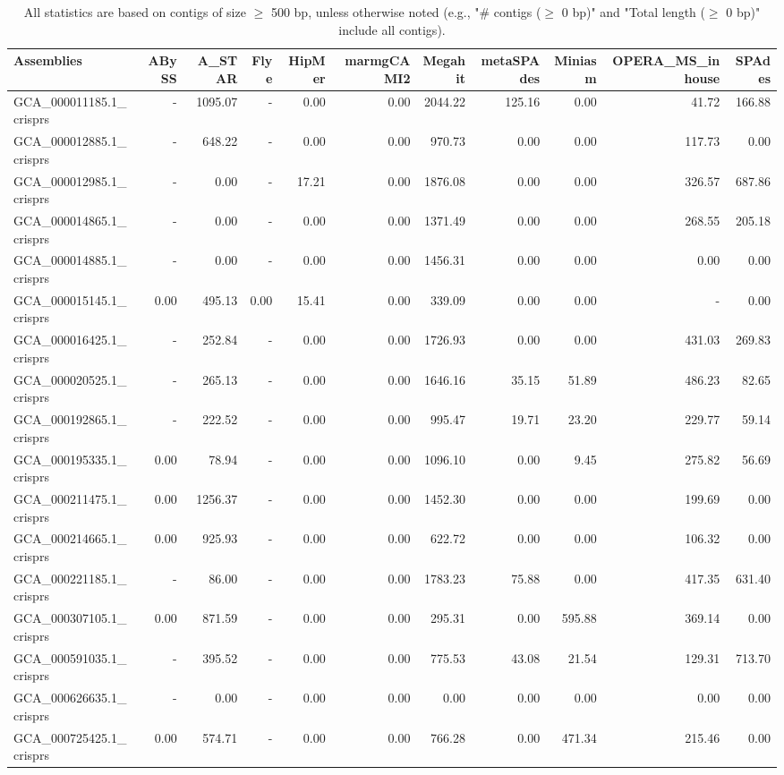 \documentclass[12pt,a4paper]{article}
\begin{document}
\begin{table}[ht]
\begin{center}
\caption{All statistics are based on contigs of size $\geq$ 500 bp, unless otherwise noted (e.g., "\# contigs ($\geq$ 0 bp)" and "Total length ($\geq$ 0 bp)" include all contigs).}
\begin{tabular}{|l*{10}{|r}|}
\hline
Assemblies & ABySS & A\_STAR & Flye & HipMer & marmgCAMI2 & Megahit & metaSPAdes & Miniasm & OPERA\_MS\_inhouse & SPAdes \\ \hline
GCA\_000011185.1\_crisprs & - & 1095.07 & - & 0.00 & 0.00 & 2044.22 & 125.16 & 0.00 & 41.72 & 166.88 \\ \hline
GCA\_000012885.1\_crisprs & - & 648.22 & - & 0.00 & 0.00 & 970.73 & 0.00 & 0.00 & 117.73 & 0.00 \\ \hline
GCA\_000012985.1\_crisprs & - & 0.00 & - & 17.21 & 0.00 & 1876.08 & 0.00 & 0.00 & 326.57 & 687.86 \\ \hline
GCA\_000014865.1\_crisprs & - & 0.00 & - & 0.00 & 0.00 & 1371.49 & 0.00 & 0.00 & 268.55 & 205.18 \\ \hline
GCA\_000014885.1\_crisprs & - & 0.00 & - & 0.00 & 0.00 & 1456.31 & 0.00 & 0.00 & 0.00 & 0.00 \\ \hline
GCA\_000015145.1\_crisprs & 0.00 & 495.13 & 0.00 & 15.41 & 0.00 & 339.09 & 0.00 & 0.00 & - & 0.00 \\ \hline
GCA\_000016425.1\_crisprs & - & 252.84 & - & 0.00 & 0.00 & 1726.93 & 0.00 & 0.00 & 431.03 & 269.83 \\ \hline
GCA\_000020525.1\_crisprs & - & 265.13 & - & 0.00 & 0.00 & 1646.16 & 35.15 & 51.89 & 486.23 & 82.65 \\ \hline
GCA\_000192865.1\_crisprs & - & 222.52 & - & 0.00 & 0.00 & 995.47 & 19.71 & 23.20 & 229.77 & 59.14 \\ \hline
GCA\_000195335.1\_crisprs & 0.00 & 78.94 & - & 0.00 & 0.00 & 1096.10 & 0.00 & 9.45 & 275.82 & 56.69 \\ \hline
GCA\_000211475.1\_crisprs & 0.00 & 1256.37 & - & 0.00 & 0.00 & 1452.30 & 0.00 & 0.00 & 199.69 & 0.00 \\ \hline
GCA\_000214665.1\_crisprs & 0.00 & 925.93 & - & 0.00 & 0.00 & 622.72 & 0.00 & 0.00 & 106.32 & 0.00 \\ \hline
GCA\_000221185.1\_crisprs & - & 86.00 & - & 0.00 & 0.00 & 1783.23 & 75.88 & 0.00 & 417.35 & 631.40 \\ \hline
GCA\_000307105.1\_crisprs & 0.00 & 871.59 & - & 0.00 & 0.00 & 295.31 & 0.00 & 595.88 & 369.14 & 0.00 \\ \hline
GCA\_000591035.1\_crisprs & - & 395.52 & - & 0.00 & 0.00 & 775.53 & 43.08 & 21.54 & 129.31 & 713.70 \\ \hline
GCA\_000626635.1\_crisprs & - & 0.00 & - & 0.00 & 0.00 & 0.00 & 0.00 & 0.00 & 0.00 & 0.00 \\ \hline
GCA\_000725425.1\_crisprs & 0.00 & 574.71 & - & 0.00 & 0.00 & 766.28 & 0.00 & 471.34 & 215.46 & 0.00 \\ \hline
\end{tabular}
\end{center}
\end{table}
\end{document}
